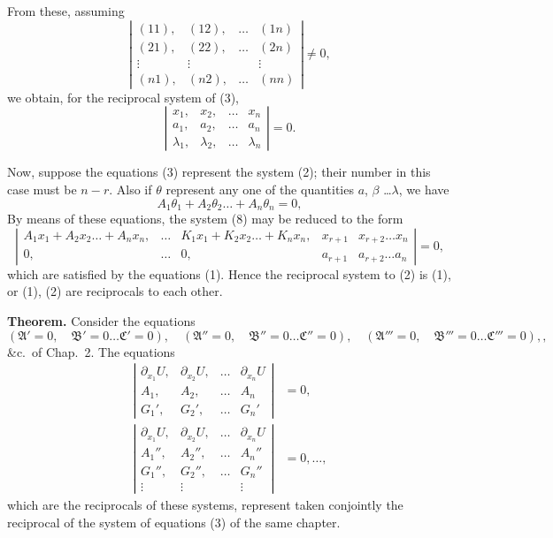 \documentclass[11pt,a4paper]{book}
\begin{document}
From these, assuming
\[
\left|\begin{array}{cccc}
(11), & (12), & \ldots & (1n) \\
(21), & (22), & \ldots & (2n) \\
\vdots & \vdots & & \vdots \\
(n1), & (n2), & \ldots & (nn)
\end{array}\right| \neq 0
\tag{7},
\]
we obtain, for the reciprocal system of (3),
\[
\left|
\begin{array}{ccccc}
x_1, & x_2, & \ldots & x_n \\
a_1, & a_2, & \ldots & a_n \\
\lambda_1, & \lambda_2, & \ldots & \lambda_n
\end{array}
\right| = 0
\tag{8}.
\]

Now, suppose the equations (3) represent the system (2); their number in this case
must be $n-r$. Also if $\theta$ represent any one of the quantities $a$, $\beta$ \ldots $\lambda$, we have
\[
A_1 \theta_1 + A_2 \theta_2 \ldots + A_n \theta_n = 0 \tag{10},
\]
By means of these equations, the system (8) may be reduced to the form
\[
\left|
\begin{array}{ccccc}
A_1 x_1 + A_2 x_2 \ldots + A_n x_n, & \ldots & K_1 x_1 + K_2 x_2 \ldots + K_n x_n, & x_{r+1} & x_{r+2} \ldots x_n \\
0, & \ldots & 0, & a_{r+1} & a_{r+2} \ldots a_n
\end{array}
\right| = 0
\tag{11},
\]
which are satisfied by the equations (1). Hence the reciprocal system to (2) is (1),
or (1), (2) are reciprocals to each other.

\newpage
\textbf{Theorem.} Consider the equations
\[
(\mathfrak{A}'=0, \quad \mathfrak{B}'=0 \ldots \mathfrak{C}'=0),
\quad (\mathfrak{A}''=0, \quad \mathfrak{B}''=0 \ldots \mathfrak{C}''=0),
\quad (\mathfrak{A}'''=0, \quad \mathfrak{B}'''=0 \ldots \mathfrak{C}'''=0),
\tag{12},
\]
\&c.\ of Chap.\ 2. The equations
\begin{align*}
\left|
\begin{array}{cccc}
\partial_{x_1} U, & \partial_{x_2} U, & \ldots & \partial_{x_n} U \\
A_1, & A_2, & \ldots & A_n \\
G_1', & G_2', & \ldots & G_n'
\end{array}
\right| &= 0, \\
\left|
\begin{array}{cccc}
\partial_{x_1} U, & \partial_{x_2} U, & \ldots & \partial_{x_n} U \\
A_1'', & A_2'', & \ldots & A_n'' \\
G_1'', & G_2'', & \ldots & G_n'' \\
\vdots & \vdots & & \vdots
\end{array}
\right| &= 0, \ldots \tag{13},
\end{align*}
which are the reciprocals of these systems, represent taken conjointly the reciprocal of
the system of equations (3) of the same chapter.
\end{document}
